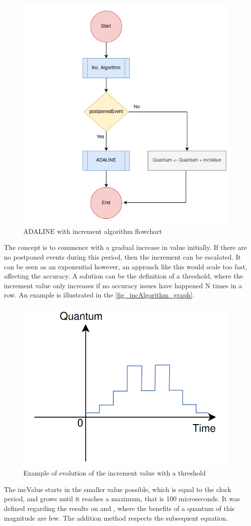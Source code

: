 \begin{figure}[H]
	\centering
 	\includegraphics[width=0.5\linewidth]{Images/ADALINE_v2.png}
 	\caption{ADALINE with increment algorithm flowchart}
	 \label{fig_ADALINE_v2}
\end{figure}

The concept is to commence with a gradual increase in value initially. If there are no postponed events during this period, then the increment can be escalated. It can be seen as an exponential however, an approach like this would scale too fast, affecting the accuracy. A solution can be the definition of a threshold, where the increment value only increases if no accuracy issues have happened N times in a row. An example is illustrated in the \autoref{fig_incAlgorithm_graph}. 

\begin{figure}[h!]
	\centering
 	\includegraphics[width=0.5\linewidth]{Images/incAlgorithm_graph.png}
 	\caption{Example of evolution of the increment value with a threshold}
	 \label{fig_incAlgorithm_graph}
\end{figure}

The incValue starts in the smaller value possible, which is equal to the clock period, and grows until it reaches a maximum, that is 100 microseconds. It was defined regarding the results on \cite{pargem5} and \cite{BeyondQuantumTDSim}, where the benefits of a quantum of this magnitude are few. The addition method respects the subsequent equation.

